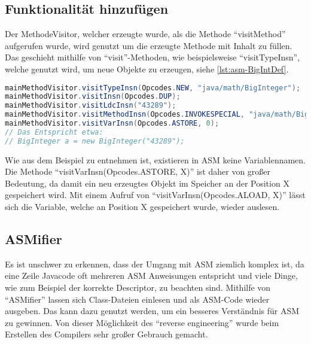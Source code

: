 \subsection{Funktionalität hinzufügen} \label{subsec:asm-insn}

Der MethodeVisitor, welcher erzeugte wurde, als die Methode \enquote{visitMethod} aufgerufen wurde, wird genutzt um die erzeugte Methode mit Inhalt zu füllen. Das geschieht mithilfe von \enquote{visit}-Methoden, wie beispielsweise \enquote{visitTypeInsn}, welche genutzt wird, um neue Objekte zu erzeugen, siehe \cref{lst:asm-BigIntDef}.

\begin{lstlisting}[language=Java, caption=Erzeugen eines BigIntegers mit ASM, label={lst:asm-BigIntDef}]
mainMethodVisitor.visitTypeInsn(Opcodes.NEW, "java/math/BigInteger");
mainMethodVisitor.visitInsn(Opcodes.DUP);
mainMethodVisitor.visitLdcInsn("43289");
mainMethodVisitor.visitMethodInsn(Opcodes.INVOKESPECIAL, "java/math/BigInteger", "<init>", "(Ljava/lang/String;)V", false);
mainMethodVisitor.visitVarInsn(Opcodes.ASTORE, 0);
// Das Entspricht etwa:
// BigInteger a = new BigInteger("43289");
\end{lstlisting}

Wie aus dem Beispiel zu entnehmen ist, existieren in ASM keine Variablennamen. Die Methode \enquote{visitVarInsn(Opcodes.ASTORE, X)} ist daher von großer Bedeutung, da damit ein neu erzeugtes Objekt im Speicher an der Position X gespeichert wird. Mit einem Aufruf von \enquote{visitVarInsn(Opcodes.ALOAD, X)} lässt sich die Variable, welche an Position X gespeichert wurde, wieder auslesen.

\subsection{ASMifier} \label{subsec:asmifer}
Es ist unschwer zu erkennen, dass der Umgang mit ASM ziemlich komplex ist, da eine Zeile Javacode oft mehreren ASM Anweisungen entspricht und viele Dinge, wie zum Beispiel der korrekte Descriptor, zu beachten sind. Mithilfe von \enquote{ASMifier} lassen sich Class-Dateien einlesen und als ASM-Code wieder ausgeben. Das kann dazu genutzt werden, um ein besseres Verständnis für ASM zu gewinnen. Von dieser Möglichkeit des \enquote{reverse engineering} wurde beim Erstellen des Compilers sehr großer Gebrauch gemacht.
